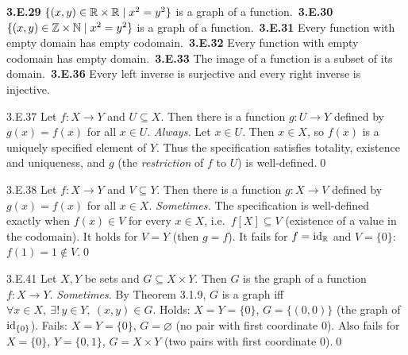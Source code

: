 \begin{trybox}[{3.E.29--3.E.33, 3.E.36 \fO}]
\textbf{3.E.29} $\{(x,y)\in\mathbb{R}\times\mathbb{R}\mid x^2=y^2\}$ is a graph of a function.\ \textbf{3.E.30} $\{(x,y)\in\mathbb{Z}\times\mathbb{N}\mid x^2=y^2\}$ is a graph of a function.\ \textbf{3.E.31} Every function with empty domain has empty codomain.\ \textbf{3.E.32} Every function with empty codomain has empty domain.\ \textbf{3.E.33} The image of a function is a subset of its domain.\ \textbf{3.E.36} Every left inverse is surjective and every right inverse is injective.
\end{trybox}

\begin{bookex}[recommended]{3.E.37}
Let $f:X\to Y$ and $U\subseteq X$. Then there is a function $g:U\to Y$ defined by $g(x)=f(x)$ for all $x\in U$.
\solution
\emph{Always.} Let $x\in U$. Then $x\in X$, so $f(x)$ is a uniquely specified element of $Y$. Thus the specification satisfies totality, existence and uniqueness, and $g$ (the \emph{restriction} of $f$ to $U$) is well-defined.\qed
\end{bookex}

\begin{bookex}[recommended]{3.E.38}
Let $f:X\to Y$ and $V\subseteq Y$. Then there is a function $g:X\to V$ defined by $g(x)=f(x)$ for all $x\in X$.
\solution
\emph{Sometimes.} The specification is well-defined exactly when $f(x)\in V$ for every $x\in X$, i.e.\ $f[X]\subseteq V$ (existence of a value in the codomain). It holds for $V=Y$ (then $g=f$). It fails for $f=\mathrm{id}_{\mathbb{R}}$ and $V=\{0\}$: $f(1)=1\notin V$.\qed
\end{bookex}

\begin{bookex}[essential]{3.E.41}
Let $X,Y$ be sets and $G\subseteq X\times Y$. Then $G$ is the graph of a function $f:X\to Y$.
\solution
\emph{Sometimes.} By Theorem 3.1.9, $G$ is a graph iff $\forall x\in X,\ \exists!\,y\in Y,\ (x,y)\in G$. Holds: $X=Y=\{0\}$, $G=\{(0,0)\}$ (the graph of $\mathrm{id}_{\{0\}}$). Fails: $X=Y=\{0\}$, $G=\varnothing$ (no pair with first coordinate $0$). Also fails for $X=\{0\}$, $Y=\{0,1\}$, $G=X\times Y$ (two pairs with first coordinate $0$).\qed
\end{bookex}

